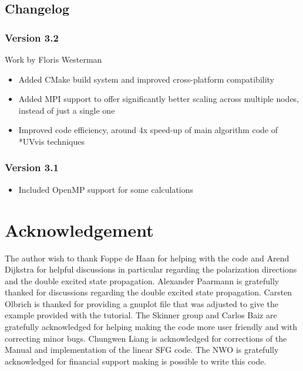 \documentclass[12pt]{book}
\begin{document}
\section{Changelog}
\subsection{Version 3.2}
{\small Work by Floris Westerman}
\begin{itemize}
\item Added CMake build system and improved cross-platform compatibility
\item Added MPI support to offer significantly better scaling across multiple nodes, instead of just a single one
\item Improved code efficiency, around 4x speed-up of main algorithm code of *UVvis techniques
\end{itemize}

\subsection{Version 3.1}
\begin{itemize}
\item Included OpenMP support for some calculations
\end{itemize}







\chapter{Acknowledgement}
The author wish to thank Foppe de Haan for helping with the code and Arend Dijkstra for 
helpful discussions in particular regarding the polarization directions and the double excited 
state propagation. Alexander Paarmann is gratefully thanked for discussions regarding the 
double excited state propagation. Carsten Olbrich is thanked for providing a gnuplot file 
that was adjusted to give the example provided with the tutorial. The Skinner group and 
Carlos Baiz are gratefully acknowledged for helping making the code more user friendly 
and with correcting minor bugs. Chungwen Liang is acknowledged for corrections of the 
Manual and implementation of the linear SFG code. The NWO is gratefully acknowledged
for financial support making is possible to write this code. 

\end{document}
